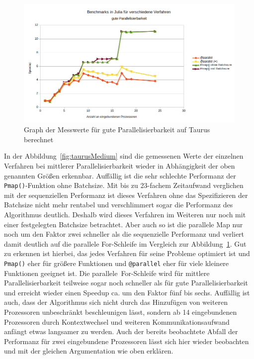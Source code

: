 \documentclass[proseminar,german,utf8]{zihpub}
\begin{document}
\begin{figure}
    \centering
    \includegraphics[scale=1, width=17cm]{bilder/parallel_performance_taurus_good.png} 
    \caption{Graph der Messwerte für gute Parallelisierbarkeit auf Taurus berechnet}
    \label{fig:taurusGood}
\end{figure}

In der Abbildung~\ref{fig:taurusMedium} sind die gemessenen Werte der einzelnen Verfahren bei mittlerer Parallelisierbarkeit wieder in Abhängigkeit der oben genannten Größen erkennbar. Auffällig ist die sehr schlechte Performanz der \verb|Pmap()|-Funktion ohne Batchsize. Mit bis zu 23-fachem Zeitaufwand verglichen mit der sequenziellen Performanz ist dieses Verfahren ohne das Spezifizieren der Batchsize nicht mehr rentabel und verschlimmert sogar die Performanz des Algorithmus deutlich. Deshalb wird dieses Verfahren im Weiteren nur noch mit einer festgelegten Batchsize betrachtet. Aber auch so ist die parallele Map nur noch um den Faktor zwei schneller als die sequenzielle Performanz und verliert damit deutlich auf die parallele For-Schleife im Vergleich zur Abbildung~\ref{fig:taurusGood}. Gut zu erkennen ist hierbei, das jedes Verfahren für seine Probleme optimiert ist und \verb|Pmap()| eher für größere Funktionen und \verb|@parallel| eher für viele kleinere Funktionen geeignet ist. Die parallele~For-Schleife wird für mittlere Parallelisierbarkeit teilweise sogar noch schneller als für gute Parallelisierbarkeit und erreicht wieder einen Speedup ca. um den Faktor fünf bis sechs. Auffällig ist auch, dass der Algorithmus sich nicht durch das Hinzufügen von weiteren Prozessoren unbeschränkt beschleunigen lässt, sondern ab 14 eingebundenen Prozessoren durch Kontextwechsel und weiteren Kommunikationsaufwand anfängt etwas langsamer zu werden. Auch der bereits beobachtete Abfall der Performanz für zwei eingebundene Prozessoren lässt sich hier wieder beobachten und mit der gleichen Argumentation wie oben erklären.
\end{document}
